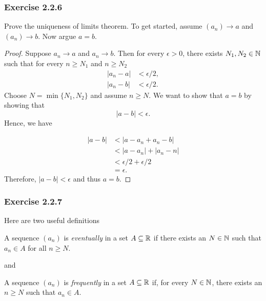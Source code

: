 \subsubsection{Exercise 2.2.6}
Prove the uniqueness of limits theorem. To get started, assume \( (a_n) \to a \) and \( (a_n) \to b \). Now argue \( a = b \).
\begin{proof}
Suppose \( a_n \to a \) and \( a_n \to b \). Then for every \( \epsilon  > 0 \), there exists \( N_1, N_2 \in \mathbb{N} \) such that for every \( n \geq N_1 \) and \( n \geq N_2\)
\begin{align*}
    | a_n - a |  &< \epsilon /2, \\
    | a_n - b  | &< \epsilon / 2. 
\end{align*}
Choose \( N = \min \{ N_1, N_2 \}\) and assume \( n \geq N \). We want to show that \( a = b \) by showing that 
\[ | a - b  | < \epsilon. \]
Hence, we have 

\begin{align*}
   |a - b | &< | a - a_n + a_n - b | \\
            &< |a - a_n| + |a_n - n | \tag{Triangle Inequality}\\  
            &< \epsilon /2 + \epsilon /2 \tag{ \( a_n \to a \), \( a_n \to b\)} \\ 
            &= \epsilon.
\end{align*}
Therefore, \( | a - b  | < \epsilon  \) and thus \( a = b \).

\end{proof}
\subsubsection{Exercise 2.2.7}

Here are two useful definitions 
\begin{tcolorbox}
\begin{defn}
A sequence \( (a_n)\) is \textit{eventually} in a set \( A \subseteq \mathbb{R} \) if there exists an \( N \in \mathbb{N} \) such that \( a_n \in A \) for all \( n \geq N \).
\end{defn}
\end{tcolorbox}

and

\begin{tcolorbox}
\begin{defn}
A sequence \( (a_n)\) is \textit{frequently} in a set \( A \subseteq \mathbb{R} \) if, for every \( N \in \mathbb{N} \), there exists an \( n \geq N \) such that \( a_n \in A \).
\end{defn}
\end{tcolorbox}

